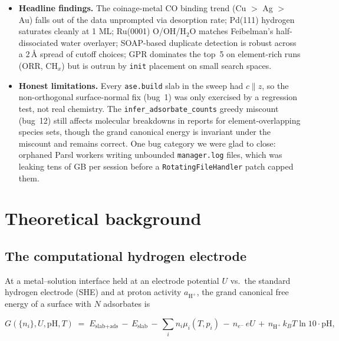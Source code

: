 \documentclass[11pt,letterpaper]{article}
\begin{document}
\begin{itemize}
    (Cu(111)/(100)/(211), Pt(111)/(211), Ag(111), Pd(111), Ni(111),
    Au(111), Ru(0001)) using FAIRChem UMA as the MLIP. Five real bugs
    were surfaced and fixed during the sweep, and every run
    reproduced (or falsified) at least one literature result.
  \item \textbf{Headline findings.} The coinage-metal CO binding trend
    (Cu $>$ Ag $>$ Au) falls out of the data unprompted via desorption
    rate; Pd(111) hydrogen saturates cleanly at 1 ML; Ru(0001) O/OH/H$_2$O
    matches Feibelman's half-dissociated water overlayer; SOAP-based
    duplicate detection is robust across a 2\,\AA{} spread of cutoff
    choices; GPR dominates the top~5 on element-rich runs (ORR, CH$_x$)
    but is outrun by \texttt{init} placement on small search spaces.
  \item \textbf{Honest limitations.} Every \texttt{ase.build} slab in
    the sweep had $c \parallel z$, so the non-orthogonal surface-normal
    fix (bug~1) was only exercised by a regression test, not real
    chemistry. The \texttt{infer\_adsorbate\_counts} greedy miscount
    (bug~12) still affects molecular breakdowns in reports for
    element-overlapping species sets, though the grand canonical
    energy is invariant under the miscount and remains correct. One
    bug category we were glad to close: orphaned Parsl workers
    writing unbounded \texttt{manager.log} files, which was leaking
    tens of GB per session before a \texttt{RotatingFileHandler} patch
    capped them.
\end{itemize}

\section{Theoretical background}
\label{sec:theory}

\subsection{The computational hydrogen electrode}

At a metal--solution interface held at an electrode potential $U$ vs.\
the standard hydrogen electrode (SHE) and at proton activity $a_{\text{H}^+}$,
the grand canonical free energy of a surface with $N$ adsorbates is

\begin{equation}
\label{eq:gce}
G(\{n_i\}, U, \text{pH}, T)
  \;=\;
  E_{\text{slab+ads}}
  \,-\, E_{\text{slab}}
  \,-\, \sum_i n_i \mu_i(T, p_i)
  \,-\, n_{e^-}\, e U
  \,+\, n_{\text{H}^+}\, k_B T \ln 10 \cdot \text{pH},
\end{equation}
\end{document}
